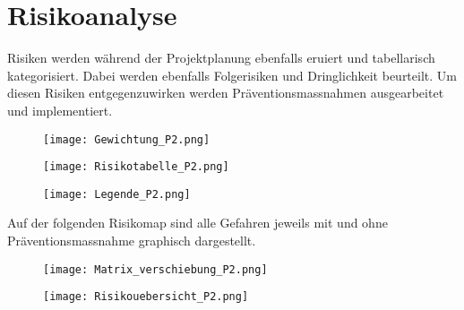 \section{Risikoanalyse}
Risiken werden während der Projektplanung ebenfalls eruiert und tabellarisch kategorisiert. Dabei werden ebenfalls Folgerisiken und Dringlichkeit beurteilt. Um diesen Risiken entgegenzuwirken werden Präventionsmassnahmen ausgearbeitet und implementiert. 

\begin{figure}[H]
	\centering
	\texttt{[image: Gewichtung\_P2.png]}
	\label{fig:Gewichtung}
\end{figure}

\newpage



\begin{figure}[H]
\centering
\texttt{[image: Risikotabelle\_P2.png]}
\label{fig:Risikotabell}
\end{figure}

\newpage
\begin{figure}[H]
	\centering
	\texttt{[image: Legende\_P2.png]}
	\label{fig:Tabelle}
\end{figure}






Auf der folgenden Risikomap sind alle Gefahren jeweils mit und ohne Präventionsmassnahme graphisch dargestellt.

\begin{figure}[H]
	\centering
	\texttt{[image: Matrix\_verschiebung\_P2.png]}
	\label{fig:Matrix_verschiebung}
\end{figure}


\begin{figure}[H]
	\centering
	\texttt{[image: Risikouebersicht\_P2.png]}
	\label{fig:Risikoüebersicht}
\end{figure}
